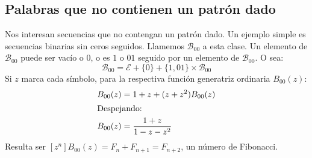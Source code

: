 %

\subsection{Palabras que no contienen un patrón dado}
\label{sec:strings-excluding-pattern}

  Nos interesan secuencias que no contengan un patrón dado.%
  Un ejemplo simple es secuencias binarias sin ceros seguidos.
  Llamemos \(\mathcal{B}_{00}\) a esta clase.
  Un elemento de \(\mathcal{B}_{00}\) puede ser vacío o \(0\),
  o es \(1\) o \(01\)
  seguido por un elemento de \(\mathcal{B}_{00}\).
  O sea:
  \begin{equation*}
    \mathcal{B}_{00}
      = \mathcal{E} + \{0\} + \{1, 01\} \times \mathcal{B}_{00}
  \end{equation*}
  Si \(z\) marca cada símbolo,
  para la respectiva función generatriz ordinaria \(B_{00}(z)\):%
  \begin{align*}
    B_{00}(z)
      &= 1 + z + (z + z^2) B_{00}(z) \\
  \intertext{Despejando:}
    B_{00}(z)
      &= \frac{1 + z}{1 - z - z^2}
  \end{align*}
  Resulta ser
    \(\left[ z^n \right] B_{00}(z) = F_n + F_{n + 1} = F_{n + 2}\),
  un número de Fibonacci.%

